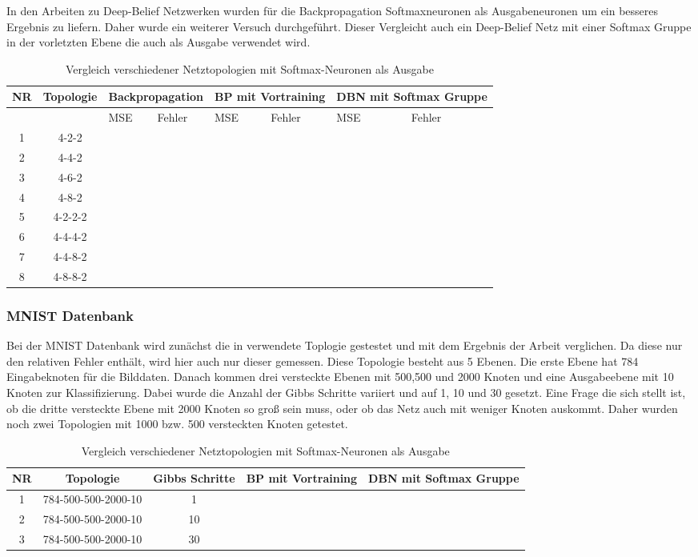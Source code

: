\documentclass[12pt]{article}
\begin{document}
	In den Arbeiten zu Deep-Belief Netzwerken wurden für die Backpropagation Softmaxneuronen als Ausgabeneuronen um ein besseres Ergebnis zu liefern. Daher wurde ein weiterer Versuch durchgeführt. Dieser Vergleicht auch ein Deep-Belief Netz mit einer Softmax Gruppe in der vorletzten Ebene die auch als Ausgabe verwendet wird.

\begin{table}[H]
\begin{tabularx}{\textwidth}{|c|c|X|X|X|X|X|X|}
	\hline
	NR & Topologie & \multicolumn{2}{|c|}{Backpropagation} & \multicolumn{2}{|c|}{BP mit Vortraining} & \multicolumn{2}{|c|}{DBN mit Softmax Gruppe}\\\hline
	&&MSE& Fehler&MSE& Fehler&MSE& Fehler
	\\\hline
	1&4-2-2&&&&&&\\\hline
	2&4-4-2&&&&&&\\\hline
	3&4-6-2&&&&&&\\\hline
	4&4-8-2&&&&&&\\\hline
	5&4-2-2-2&&&&&&\\\hline
	6&4-4-4-2&&&&&&\\\hline
	7&4-4-8-2&&&&&&\\\hline
	8&4-8-8-2&&&&&&\\\hline
	\end{tabularx}
	\caption{Vergleich verschiedener Netztopologien mit Softmax-Neuronen als Ausgabe}
	\end{table}
	\subsubsection{MNIST Datenbank}
	
	Bei der MNIST Datenbank wird zunächst die in \cite{learning} verwendete Toplogie gestestet und mit dem Ergebnis der Arbeit verglichen. Da diese nur den relativen Fehler enthält, wird hier auch nur dieser gemessen. Diese Topologie besteht aus 5 Ebenen. Die erste Ebene hat 784 Eingabeknoten für die Bilddaten. Danach kommen drei versteckte Ebenen mit 500,500 und 2000 Knoten und eine Ausgabeebene mit 10 Knoten zur Klassifizierung. Dabei wurde die Anzahl der Gibbs Schritte variiert und auf 1, 10 und 30 gesetzt. Eine Frage die sich stellt ist, ob die dritte versteckte Ebene mit 2000 Knoten so groß sein muss, oder ob das Netz auch mit weniger Knoten auskommt. Daher wurden noch zwei Topologien mit 1000 bzw. 500 versteckten Knoten getestet.
	\begin{table}[H]
\begin{tabularx}{\textwidth}{|c|c|c|c|X|}
	\hline
	NR & Topologie &Gibbs Schritte& BP mit Vortraining & DBN mit Softmax Gruppe
	\\\hline
	1&784-500-500-2000-10&1&&\\\hline
	2&784-500-500-2000-10&10&&\\\hline
	3&784-500-500-2000-10&30&&\\\hline
	\end{tabularx}
	\caption{Vergleich verschiedener Netztopologien mit Softmax-Neuronen als Ausgabe}
	\end{table}
\end{document}
